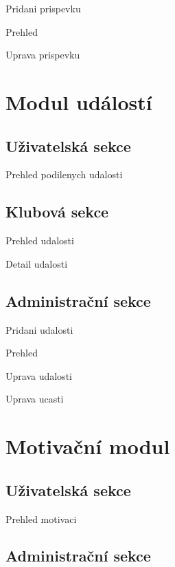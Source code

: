 \documentclass[11pt,oneside]{fithesis}
\begin{document}
            Pridani prispevku

            Prehled

            Uprava prispevku



        \section{Modul událostí}



            \subsection*{Uživatelská sekce}

            Prehled podilenych udalosti



            \subsection*{Klubová sekce}

            Prehled udalosti

            Detail udalosti



            \subsection*{Administrační sekce}

            Pridani udalosti

            Prehled

            Uprava udalosti

            Uprava ucasti



        \section{Motivační modul}



            

            \subsection*{Uživatelská sekce}

            Prehled motivaci



            \subsection*{Administrační sekce}
\end{document}
